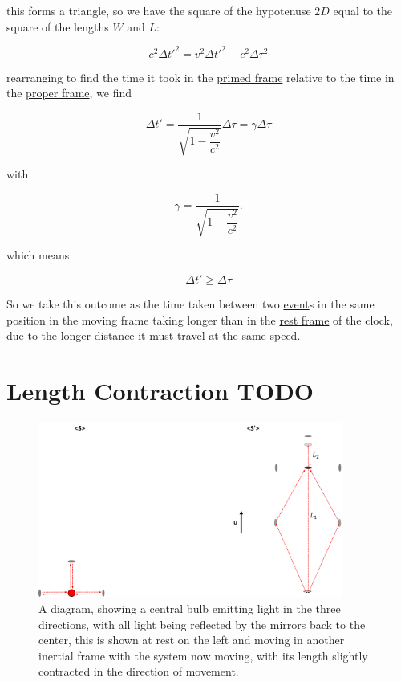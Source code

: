 this forms a triangle, so we have the square of the hypotenuse $2D$ equal to the square of the lengths $W$ and $L$:

\begin{equation}
	c^2 \Delta t{'}^2 = v^2 \Delta t{'}^2 + c^2\Delta \tau^2
\end{equation}

rearranging to find the time it took in the \hyperlink{def-Primed-Frame}{primed frame} relative to the time in the \hyperlink{def-proper-frame}{proper frame}, we find

\begin{equation}
	\Delta t{'} = \dfrac{1}{\sqrt{1-\dfrac{v^2}{c^2}}} \Delta \tau = {\gamma} \Delta \tau
\end{equation}

with

\begin{equation}
	{\gamma} = \dfrac{1}{\sqrt{1-\dfrac{v^2}{c^2}}}.
\end{equation}

which means

\begin{equation}
	\Delta t{'} \geq \Delta \tau
\end{equation}

So we take this outcome as the time taken between two \hyperlink{def-event}{event}s in the same position in the moving frame taking longer than in the \hyperlink{def-proper-frame}{rest frame} of the clock, due to the longer distance it must travel at the same speed.

\section{Length Contraction TODO}

\begin{figure}[H]
	\centering
	\includegraphics[width=10cm]{images/pdf/Length_Contraction.pdf}
	\caption{A diagram, showing a central bulb emitting light in the three directions, with all light being reflected by the mirrors back to the center, this is shown at rest on the left and moving in another inertial frame with the system now moving, with its length slightly contracted in the direction of movement.}
	\label{fig: length contraction math}
\end{figure}


